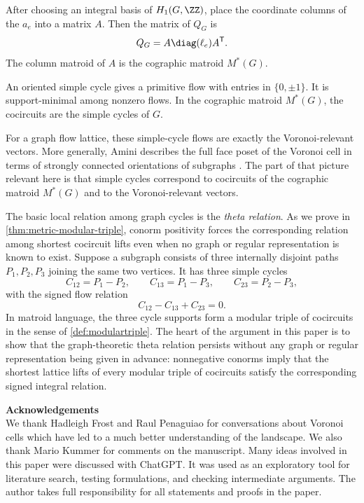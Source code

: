 \documentclass[11pt,letterpaper]{amsart}
\begin{document}
After choosing an integral basis of $H_1(G,\ZZ)$, place the coordinate columns of the $a_e$ into a matrix $A$.  Then the matrix of $Q_G$ is
\[
  Q_G=A\diag(\ell_e)A^{\mathsf T}.
\]
The column matroid of $A$ is the cographic matroid $M^*(G)$.

An oriented simple cycle gives a primitive flow with entries in $\{0,\pm1\}$.  It is support-minimal among nonzero flows.  In the cographic matroid $M^*(G)$, the cocircuits are the simple cycles of $G$.

For a graph flow lattice, these simple-cycle flows are exactly the Voronoi-relevant vectors.  More generally, Amini describes the full face poset of the Voronoi cell in terms of strongly connected orientations of subgraphs \cite{amini2010lattice}.  The part of that picture relevant here is that simple cycles correspond to cocircuits of the cographic matroid $M^*(G)$ and to the Voronoi-relevant vectors. 

The basic local relation among graph cycles is the \emph{theta relation}. As we prove in \cref{thm:metric-modular-triple}, conorm positivity forces the corresponding relation among shortest cocircuit lifts even when no graph or regular representation is known to exist. Suppose a subgraph consists of three internally disjoint paths $P_1,P_2,P_3$ joining the same two vertices.  It has three simple cycles
\[
  C_{12}=P_1-P_2,\qquad
  C_{13}=P_1-P_3,\qquad
  C_{23}=P_2-P_3,
\]
with the signed flow relation
\[
  C_{12}-C_{13}+C_{23}=0.
\]
In matroid language, the three cycle supports form a modular triple of cocircuits in the sense of \cref{def:modulartriple}. The heart of the argument in this paper is to show that the graph-theoretic theta relation persists without any graph or regular representation being given in advance: nonnegative conorms imply that the shortest lattice lifts of every modular triple of cocircuits satisfy the corresponding signed integral relation.


\vspace{1cm}
\textbf{Acknowledgements}\\
We thank Hadleigh Frost and Raul Penaguiao for conversations about Voronoi cells which have led to a much better understanding of the landscape. We also thank Mario Kummer for comments on the manuscript. Many ideas involved in this paper were discussed with ChatGPT. It was used as an exploratory tool for literature search, testing formulations, and checking intermediate arguments. The author takes full responsibility for all
statements and proofs in the paper. 
\end{document}
